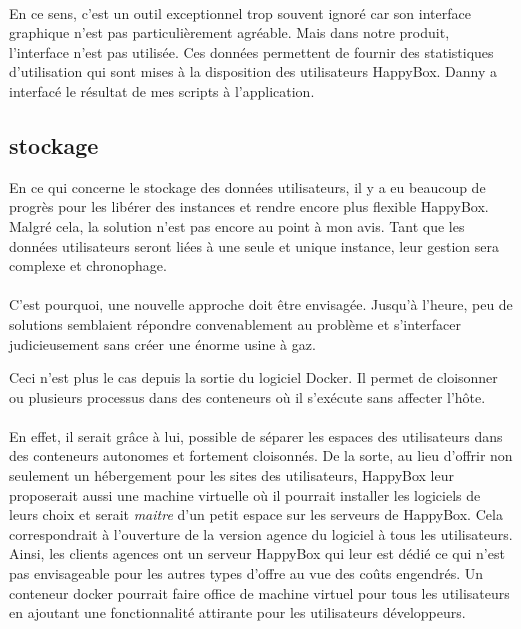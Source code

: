 \documentclass[11pt, a4paper ]{article}
\begin{document}
\begin{spacing}{1.5}
\paragraph{}
En ce sens, c'est un outil exceptionnel trop souvent ignoré car son interface graphique n'est pas particulièrement agréable. Mais dans notre produit, l'interface n'est pas utilisée. Ces données permettent de fournir des statistiques d'utilisation qui sont mises à la disposition des utilisateurs HappyBox. Danny a interfacé le résultat de mes scripts à l'application.

\subsection{stockage}
En ce qui concerne le stockage des données utilisateurs, il y a eu beaucoup de progrès pour les libérer des instances et rendre encore plus flexible HappyBox. Malgré cela, la solution n'est pas encore au point à mon avis. Tant que les données utilisateurs seront liées à une seule et unique instance, leur gestion sera complexe et chronophage.
\paragraph{}
C'est pourquoi, une nouvelle approche doit être envisagée. Jusqu'à l'heure, peu de solutions semblaient répondre convenablement au problème et s'interfacer judicieusement sans créer une énorme usine à gaz.

Ceci n'est plus le cas depuis la sortie du logiciel Docker. Il permet de cloisonner ou plusieurs processus dans des conteneurs où il s’exécute sans affecter l’hôte.
\paragraph{}
En effet, il serait grâce à lui, possible de séparer les espaces des utilisateurs dans des conteneurs autonomes et fortement cloisonnés. De la sorte, au lieu d'offrir non seulement un hébergement pour les sites des utilisateurs, HappyBox leur proposerait aussi une machine virtuelle où il pourrait installer les logiciels de leurs choix et serait \emph{maitre} d'un petit espace sur les serveurs de HappyBox. Cela correspondrait à l'ouverture de la version agence du logiciel à tous les utilisateurs.
Ainsi, les clients agences ont un serveur HappyBox qui leur est dédié ce qui n'est pas envisageable pour les autres types d'offre au vue des coûts engendrés. Un conteneur docker pourrait faire office de machine virtuel pour tous les utilisateurs en ajoutant une fonctionnalité attirante pour les utilisateurs développeurs.

\end{spacing}
\end{document}
